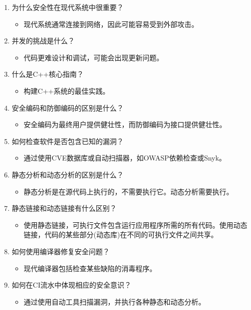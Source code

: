 \begin{enumerate}
\item
为什么安全性在现代系统中很重要？
\begin{itemize}
\item 
现代系统通常连接到网络，因此可能容易受到外部攻击。
\end{itemize}

\item
并发的挑战是什么？
\begin{itemize}
\item 
代码更难设计和调试，可能会出现更新问题。
\end{itemize}

\item
什么是C++核心指南？
\begin{itemize}
\item 
构建C++系统的最佳实践。
\end{itemize}

\item
安全编码和防御编码的区别是什么？
\begin{itemize}
\item 
安全编码为最终用户提供健壮性，而防御编码为接口提供健壮性。
\end{itemize}

\item
如何检查软件是否包含已知的漏洞？
\begin{itemize}
\item 
通过使用CVE数据库或自动扫描器，如OWASP依赖检查或Snyk。
\end{itemize}

\item
静态分析和动态分析的区别是什么？
\begin{itemize}
\item 
静态分析是在源代码上执行的，不需要执行它。动态分析需要执行。
\end{itemize}

\item
静态链接和动态链接有什么区别？
\begin{itemize}
\item 
使用静态链接，可执行文件包含运行应用程序所需的所有代码。使用动态链接，代码的某些部分(动态库)在不同的可执行文件之间共享。
\end{itemize}

\item
如何使用编译器修复安全问题？
\begin{itemize}
\item 
现代编译器包括检查某些缺陷的消毒程序。
\end{itemize}

\item
如何在CI流水中体现相应的安全意识？
\begin{itemize}
\item 
通过使用自动工具扫描漏洞，并执行各种静态和动态分析。
\end{itemize}
\end{enumerate}